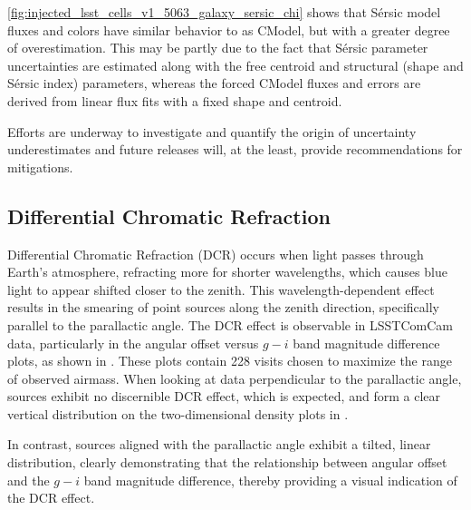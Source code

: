 \ref{fig:injected_lsst_cells_v1_5063_galaxy_sersic_chi} shows that S\'ersic model fluxes and colors have similar behavior to as CModel, but with a greater degree of overestimation.
This may be partly due to the fact that S\'ersic parameter uncertainties are estimated along with the free centroid and structural (shape and S\'ersic index) parameters, whereas the forced CModel fluxes and errors are derived from linear flux fits with a fixed shape and centroid.

Efforts are underway to investigate and quantify the origin of uncertainty underestimates and future releases will, at the least, provide recommendations for mitigations.

\subsection{Differential Chromatic Refraction}
\label{sec:differential_chromatic_refraction}
\gls{Differential Chromatic Refraction} (DCR) occurs when light passes through Earth’s atmosphere, refracting more for shorter wavelengths, which causes blue light to appear shifted closer to the zenith.
This wavelength-dependent effect results in the smearing of point sources along the zenith direction, specifically parallel to the parallactic angle.
The DCR effect is observable in LSSTComCam data, particularly in the angular offset versus $g-i$ band magnitude difference plots,  as shown in . 
These plots contain 228 visits chosen to maximize the range of observed airmass.
When looking at data perpendicular to the parallactic angle, sources exhibit no discernible DCR effect, which is expected, and form a clear vertical distribution on the two-dimensional density plots in .

In contrast, sources aligned with the parallactic angle exhibit a tilted, linear distribution, clearly demonstrating that the relationship between angular offset and the $g-i$ band magnitude difference, thereby providing a visual indication of the \gls{DCR} effect.

